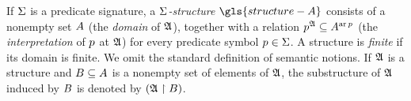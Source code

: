 
If $\mathrm{\Sigma}$ is a predicate signature, a \emph{$\mathrm{\Sigma}$-structure}
$\gls{structure-A}$ consists of a nonempty set $A$ (the \emph{domain} of
$\mathfrak{A}$), together with a relation $p^{\mathfrak{A}} \subseteq A^{\operatorname{ar}p}$ (the
\emph{interpretation} of $p$ at $\mathfrak{A}$) for every predicate symbol $p
\in \mathrm{\Sigma}$. A structure is \emph{finite} if its domain is finite.
We omit the standard definition of semantic notions.
If $\mathfrak{A}$ is a structure and $B \subseteq A$ is a nonempty set of
elements of $\mathfrak{A}$, the substructure of $\mathfrak{A}$ induced by $B$ is denoted
by $(\mathfrak{A} \restriction B)$.